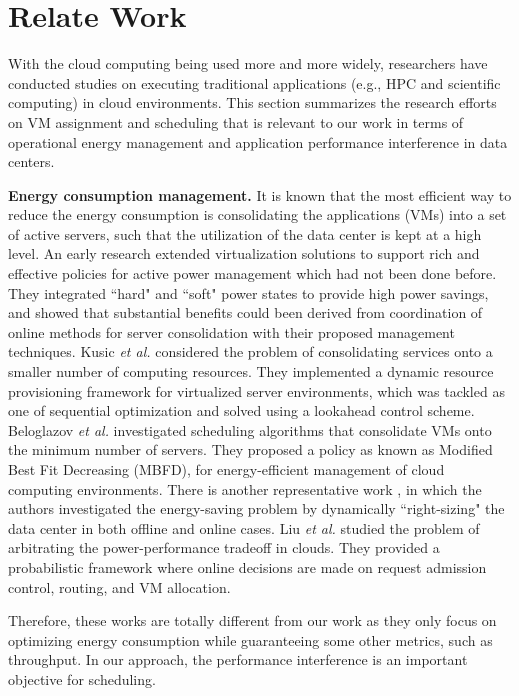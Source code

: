 \documentclass[10pt,journal]{IEEEtran}
\begin{document}
\section{Relate Work}
\label{sec:related}

With the cloud computing being used more and more widely, researchers have conducted studies on executing traditional applications (e.g., HPC and scientific computing) in cloud environments. This section summarizes the research efforts on VM assignment and scheduling that is relevant to our work in terms of operational energy management and application performance interference in data centers.

\textbf{Energy consumption management.} 
It is known that the most efficient way to reduce the energy consumption is consolidating the applications (VMs) into a set of active servers, such that the utilization of the data center is kept at a high level. An early research \cite{Nathuji07} extended virtualization solutions to support rich and effective policies for active power management which had not been done before. They integrated ``hard" and ``soft" power states to provide high power savings, and showed that substantial benefits could been derived from coordination of online methods for server consolidation with their proposed management techniques. Kusic \emph{et al.} \cite{Kusic09} considered the problem of consolidating services onto a smaller number of computing resources. They implemented a dynamic resource provisioning framework for virtualized server environments, which was tackled as one of sequential optimization and solved using a lookahead control scheme. Beloglazov \emph{et al.} \cite{Beloglazov12} investigated scheduling algorithms that consolidate VMs onto the minimum number of servers. They proposed a policy as known as Modified Best Fit Decreasing (MBFD), for energy-efficient management of cloud computing environments. There is another representative work \cite{Lin11}, in which the authors investigated the energy-saving problem by dynamically ``right-sizing" the data center in both offline and online cases. Liu \emph{et al.} \cite{Liu13} studied the problem of arbitrating the power-performance tradeoff in clouds. They provided a probabilistic framework where online decisions are made on request admission control, routing, and VM allocation.

Therefore, these works are totally different from our work as they only focus on optimizing energy consumption while guaranteeing some other metrics, such as throughput. In our approach, the performance interference is an important objective for scheduling.
\end{document}
